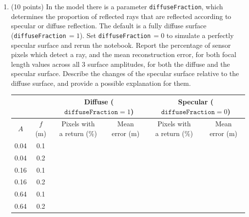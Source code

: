\documentclass[../../me144_244_student.tex]{subfiles}
\begin{document}
\begin{enumerate}
\begin{enumerate}
        \item (10 points) In the model there is a parameter \texttt{diffuseFraction}, which determines the
        proportion of reflected rays that are reflected according to specular or diffuse reflection.
        The default is a fully diffuse surface (\texttt{diffuseFraction}\,$=1$). Set
        \texttt{diffuseFraction}\,$=0$ to simulate a perfectly specular surface and rerun the
        notebook. Report the percentage of sensor pixels which detect a ray, and the mean
        reconstruction error, for both focal length values across all 3 surface amplitudes, for
        both the diffuse and the specular surface. Describe the changes of the specular surface
        relative to the diffuse surface, and provide a possible explanation for them.

        \begin{table}[H]
        \centering
        \renewcommand{\arraystretch}{1.4}
        \begin{tabular}{||c|c|c|c|c|c||}
            \hline
            & & \multicolumn{2}{c|}{Diffuse ($\texttt{diffuseFraction}=1$)} & \multicolumn{2}{c||}{Specular ($\texttt{diffuseFraction}=0$)} \\
            \hline
            $A$ & $f$ (m) & \shortstack{Pixels with\\a return (\%)} & \shortstack{Mean\\error (m)} & \shortstack{Pixels with\\a return (\%)} & \shortstack{Mean\\error (m)} \\
            \hline \hline
            0.04 & 0.1 & & & & \\
            \hline
            0.04 & 0.2 & & & & \\
            \hline
            0.16 & 0.1 & & & & \\
            \hline
            0.16 & 0.2 & & & & \\
            \hline
            0.64 & 0.1 & & & & \\
            \hline
            0.64 & 0.2 & & & & \\
            \hline
        \end{tabular}
        \end{table}


\end{enumerate}
\end{enumerate}
\end{document}
